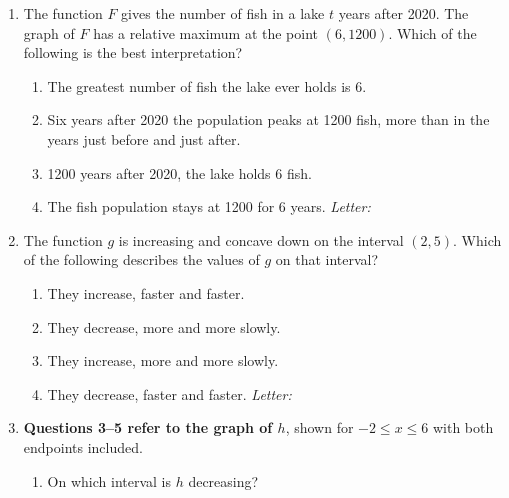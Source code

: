 \documentclass[10pt]{article}
\begin{document}
\begin{enumerate}[leftmargin=1.9em, itemsep=12pt]

\item The function $F$ gives the number of fish in a lake $t$ years after 2020. The graph of
      $F$ has a relative maximum at the point $(6, 1200)$. Which of the following is the best
      interpretation?
      \begin{enumerate}[leftmargin=2.6em, itemsep=2pt]
        \item[(A)] The greatest number of fish the lake ever holds is 6.
        \item[{\color{keyred}$\checkmark$\,(B)}] Six years after 2020 the population peaks at 1200 fish, more than in the years
                   just before and just after.
        \item[(C)] 1200 years after 2020, the lake holds 6 fish.
        \item[(D)] The fish population stays at 1200 for 6 years. \hfill\textit{Letter:}~\gradedblank[id=ap1, type=choice, points=1, answer=B]{0.42in}{13pt}
      \end{enumerate}

\item The function $g$ is increasing and concave down on the interval $(2, 5)$. Which of the
      following describes the values of $g$ on that interval?
      \begin{enumerate}[leftmargin=2.6em, itemsep=2pt]
        \item[(A)] They increase, faster and faster.
        \item[(B)] They decrease, more and more slowly.
        \item[{\color{keyred}$\checkmark$\,(C)}] They increase, more and more slowly.
        \item[(D)] They decrease, faster and faster. \hfill\textit{Letter:}~\gradedblank[id=ap2, type=choice, points=1, answer=C]{0.42in}{13pt}
      \end{enumerate}

\newpage
\item[] \begin{minipage}[t]{0.5\linewidth}
      \textbf{Questions 3--5 refer to the graph of $h$}, shown for $-2 \le x \le 6$ with both
      endpoints included.

      \vspace{8pt}
      \begin{enumerate}[label=\arabic*., leftmargin=1.9em, itemsep=10pt, start=3]
      \item On which interval is $h$ decreasing?


\end{enumerate}
\end{minipage}
\end{enumerate}
\end{document}
